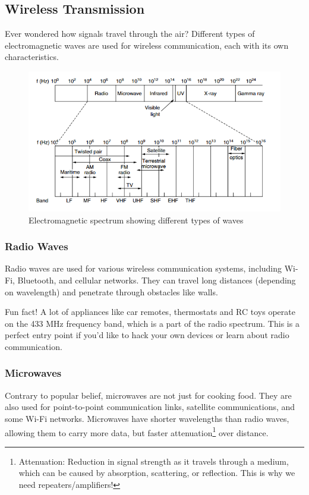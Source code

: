 \vspace{1em}

\newpage

\subsection*{Wireless Transmission}
Ever wondered how signals travel through the air? Different types of electromagnetic waves are used for wireless communication, each with its own characteristics.

\begin{figure}[h]
    \centering
    \includegraphics[width=.8\textwidth]{assets/osi/physical/spectrum.png}
    \caption{Electromagnetic spectrum showing different types of waves}\label{fig:em_spectrum}
\end{figure}

\subsubsection*{Radio Waves}
Radio waves are used for various wireless communication systems, including Wi-Fi, Bluetooth, and cellular networks. They can travel long distances (depending on wavelength) and penetrate through obstacles like walls.

\begin{noteblock}
    Fun fact! A lot of appliances like car remotes, thermostats and RC toys operate on the 433 MHz frequency band, which is a part of the radio spectrum. This is a perfect entry point if you'd like to hack your own devices or learn about radio communication.
\end{noteblock}

\subsubsection*{Microwaves}
Contrary to popular belief, microwaves are not just for cooking food. They are also used for point-to-point communication links, satellite communications, and some Wi-Fi networks. Microwaves have shorter wavelengths than radio waves, allowing them to carry more data, but faster attenuation\footnote{
    Attenuation: Reduction in signal strength as it travels through a medium, which can be caused by absorption, scattering, or reflection. 
    This is why we need repeaters/amplifiers!
} over distance.

